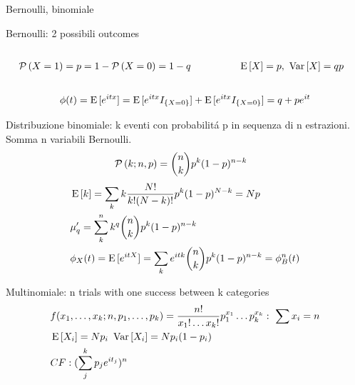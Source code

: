 \documentclass[asd-beamer.tex]{subfiles}
\begin{document}
\begin{frame}{Bernoulli, binomiale}
\begin{block}{Bernoulli: 2 possibili outcomes}
	\begin{columns}[T]
	\begin{column}{0.6\textwidth}
	\begin{align*}
	&\operatorname{\mathcal{P}}{(X=1)}=p=1-\operatorname{\mathcal{P}}{(X=0)}=1-q
	\end{align*}
	\end{column}
	\begin{column}{0.4\textwidth}
	\begin{align*}
	&\operatorname{E}{[X]}=p,\ \operatorname{Var}{[X]}=qp
	\end{align*}
	\end{column}
	\end{columns}
\[\phi(t)=\operatorname{E}{[e^{itx}]}=\operatorname{E}{[e^{itx}I_{\{X=0\}}]}+\operatorname{E}{[e^{itx}I_{\{X=0\}}]}=q+pe^{it}\]
\end{block}
\begin{block}{Distribuzione binomiale: k eventi con probabilit\'a p in sequenza di n estrazioni. Somma n variabili Bernoulli.}
\begin{align*}
&\operatorname{\mathcal{P}}{(k;n,p)}=\binom{n}{k}p^k(1-p)^{n-k}
\end{align*}
\begin{align*}
&\operatorname{E}{[k]}=\sum_kk\frac{N!}{k!(N-k)!}p^k(1-p)^{N-k}=Np\\
&\mu'_q=\sum_k^nk^q\binom{n}{k}p^k(1-p)^{n-k}\\
&\phi_X(t)=\operatorname{E}{[e^{itX}]}=\sum_ke^{itk}\binom{n}{k}p^k(1-p)^{n-k}=\phi_B^n(t)
\end{align*}
\end{block}
\end{frame}

\begin{frame}{Multinomiale: n trials with one success between k categories}
	\begin{align*}
	&f(x_1,\ldots,x_k;n,p_1,\ldots,p_k)=\frac{n!}{x_1!\ldots x_k!}p_1^{x_1}\ldots p_k^{x_k}:\ \sum x_i=n\\
	&\operatorname{E}{[X_i]}=Np_i\ \operatorname{Var}{[X_i]}=Np_i(1-p_i)\\
	&CF: (\sum_j^kp_je^{it_j})^n
	\end{align*}
\end{frame}
\end{document}

